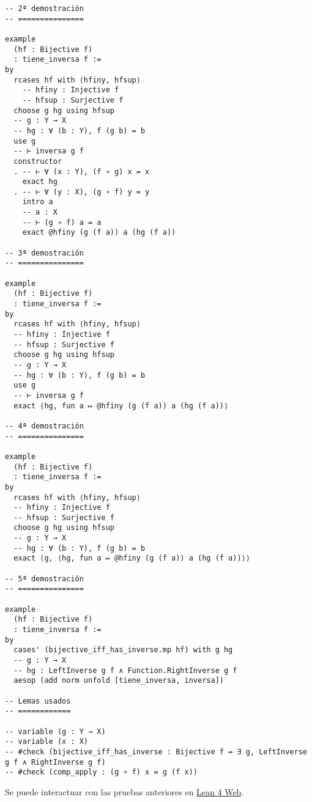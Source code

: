 \begin{verbatim}
-- 2ª demostración
-- ===============

example
  (hf : Bijective f)
  : tiene_inversa f :=
by
  rcases hf with ⟨hfiny, hfsup⟩
    -- hfiny : Injective f
    -- hfsup : Surjective f
  choose g hg using hfsup
  -- g : Y → X
  -- hg : ∀ (b : Y), f (g b) = b
  use g
  -- ⊢ inversa g f
  constructor
  . -- ⊢ ∀ (x : Y), (f ∘ g) x = x
    exact hg
  . -- ⊢ ∀ (y : X), (g ∘ f) y = y
    intro a
    -- a : X
    -- ⊢ (g ∘ f) a = a
    exact @hfiny (g (f a)) a (hg (f a))

-- 3ª demostración
-- ===============

example
  (hf : Bijective f)
  : tiene_inversa f :=
by
  rcases hf with ⟨hfiny, hfsup⟩
  -- hfiny : Injective f
  -- hfsup : Surjective f
  choose g hg using hfsup
  -- g : Y → X
  -- hg : ∀ (b : Y), f (g b) = b
  use g
  -- ⊢ inversa g f
  exact ⟨hg, fun a ↦ @hfiny (g (f a)) a (hg (f a))⟩

-- 4ª demostración
-- ===============

example
  (hf : Bijective f)
  : tiene_inversa f :=
by
  rcases hf with ⟨hfiny, hfsup⟩
  -- hfiny : Injective f
  -- hfsup : Surjective f
  choose g hg using hfsup
  -- g : Y → X
  -- hg : ∀ (b : Y), f (g b) = b
  exact ⟨g, ⟨hg, fun a ↦ @hfiny (g (f a)) a (hg (f a))⟩⟩

-- 5ª demostración
-- ===============

example
  (hf : Bijective f)
  : tiene_inversa f :=
by
  cases' (bijective_iff_has_inverse.mp hf) with g hg
  -- g : Y → X
  -- hg : LeftInverse g f ∧ Function.RightInverse g f
  aesop (add norm unfold [tiene_inversa, inversa])

-- Lemas usados
-- ============

-- variable (g : Y → X)
-- variable (x : X)
-- #check (bijective_iff_has_inverse : Bijective f ↔ ∃ g, LeftInverse g f ∧ RightInverse g f)
-- #check (comp_apply : (g ∘ f) x = g (f x))
\end{verbatim}
Se puede interactuar con las pruebas anteriores en \href{https://lean.math.hhu.de/\#url=https://raw.githubusercontent.com/jaalonso/Calculemus2/main/src/Las\_funciones\_biyectivas\_tienen\_inversa.lean}{Lean 4 Web}.

